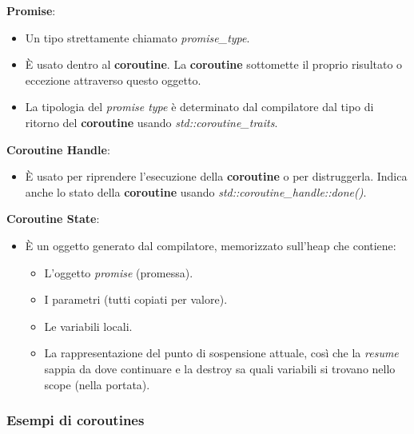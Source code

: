 \textsf{\small \textbf{Promise}: } \\

\begin{itemize}
	\item \textsf{\small Un tipo strettamente chiamato \emph{promise\_type}.}
	\item \textsf{\small È usato dentro al \textbf{coroutine}. La \textbf{coroutine} sottomette il proprio risultato o eccezione attraverso questo oggetto.}
	\item \textsf{\small La tipologia del \emph{promise type} è determinato dal compilatore dal tipo di ritorno del \textbf{coroutine} usando \emph{std::coroutine\_traits}.}
\end{itemize}

\textsf{\small \textbf{Coroutine Handle}: } \\

\begin{itemize}
	\item \textsf{\small È usato per riprendere l'esecuzione della \textbf{coroutine} o per distruggerla. Indica anche lo stato della \textbf{coroutine} usando \emph{std::coroutine\_handle::done()}.}
\end{itemize}

\textsf{\small \textbf{Coroutine State}: } \\

\begin{itemize}
	\item \textsf{\small È un oggetto generato dal compilatore, memorizzato sull'heap che contiene: }
	\begin{itemize}
		\item \textsf{\small L'oggetto \emph{promise} (promessa).}
		\item \textsf{\small I parametri (tutti copiati per valore).}
		\item \textsf{\small Le variabili locali.}
		\item \textsf{\small La rappresentazione del punto di sospensione attuale, così che la \emph{resume} sappia da dove continuare e la destroy sa quali variabili si trovano nello scope (nella portata).}
	\end{itemize}
\end{itemize}

\subsubsection{Esempi di coroutines}

